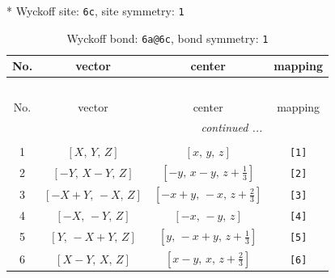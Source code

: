 \documentclass[fleqn,8pt]{jsarticle}
\begin{document}
* Wyckoff site: {\tt 6c}, site symmetry: {\tt 1}
\renewcommand{\arraystretch}{1.2}
\begin{longtable}{cccc}
\caption{Wyckoff bond: {\tt 6a@6c}, bond symmetry: {\tt 1}}
 \\
 \hline \hline
No. & vector & center & mapping \\ \hline \endfirsthead

\multicolumn{3}{l}{\tablename\ \thetable{}} \\
 \hline \hline
No. & vector & center & mapping \\ \hline \endhead

 \hline \hline
\multicolumn{3}{r}{\footnotesize\it continued ...} \\ \endfoot

 \hline \hline
\multicolumn{3}{r}{} \\ \endlastfoot

1 & $\left[ X,\, Y,\, Z \right]$ & $\left[ x,\, y,\, z \right]$ & {\tt [1]} \\ \hline
2 & $\left[ - Y,\, X - Y,\, Z \right]$ & $\left[ - y,\, x - y,\, z + \frac{1}{3} \right]$ & {\tt [2]} \\ \hline
3 & $\left[ - X + Y,\, - X,\, Z \right]$ & $\left[ - x + y,\, - x,\, z + \frac{2}{3} \right]$ & {\tt [3]} \\ \hline
4 & $\left[ - X,\, - Y,\, Z \right]$ & $\left[ - x,\, - y,\, z \right]$ & {\tt [4]} \\ \hline
5 & $\left[ Y,\, - X + Y,\, Z \right]$ & $\left[ y,\, - x + y,\, z + \frac{1}{3} \right]$ & {\tt [5]} \\ \hline
6 & $\left[ X - Y,\, X,\, Z \right]$ & $\left[ x - y,\, x,\, z + \frac{2}{3} \right]$ & {\tt [6]} \\
\end{longtable}
\end{document}
